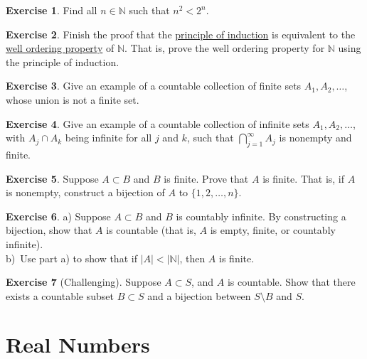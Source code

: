 \documentclass[12pt]{book}
\newcommand{\abs}[1]{\left\lvert {#1} \right\rvert}
\newcommand{\N}{{\mathbb{N}}}
\theoremstyle{plain}
\theoremstyle{remark}
\theoremstyle{definition}
\theoremstyle{exercise}
\newtheorem{exercise}{Exercise}[section]
\theoremstyle{example}
\begin{document}
\begin{exercise}
Find all $n \in \N$ such that $n^2 < 2^n$.
\end{exercise}

\begin{exercise}
Finish the proof that the \hyperref[induction:thm]{principle of induction}
is equivalent to the
\hyperlink{wop:link}{well ordering property} of $\N$.  That is,
prove the well ordering property for $\N$ using the principle of
induction.
\end{exercise}


\begin{exercise}
Give an example of a countable collection of finite sets $A_1, A_2, \ldots$,
whose union is not a finite set.
\end{exercise}

\begin{exercise}
Give an example of a countable collection of infinite sets $A_1, A_2, \ldots$,
with $A_j \cap A_k$ being infinite for all $j$ and $k$, such that
$\bigcap_{j=1}^\infty A_j$
is nonempty and finite.
\end{exercise}

\begin{exercise}
Suppose $A \subset B$ and $B$ is finite. Prove that $A$ is finite.
That is, if $A$ is nonempty, construct a bijection of $A$ to $\{ 1,2,\ldots,n \}$.
\end{exercise}

\begin{exercise}
a) Suppose $A \subset B$ and $B$ is countably infinite.  By constructing a
bijection, show that $A$ is
countable (that is, $A$ is empty, finite, or countably infinite).
\\
b)~Use part a) to show that if $\abs{A} < \abs{\N}$, then $A$ is finite.
\end{exercise}

\begin{exercise}[Challenging] \label{exercise:countsubsetbij}
Suppose $A \subset S$, and $A$ is countable.
Show that there exists a countable subset $B \subset S$ and
a bijection between $S \setminus B$ and $S$.
\end{exercise}



\chapter{Real Numbers} \label{rn:chapter}
\end{document}
